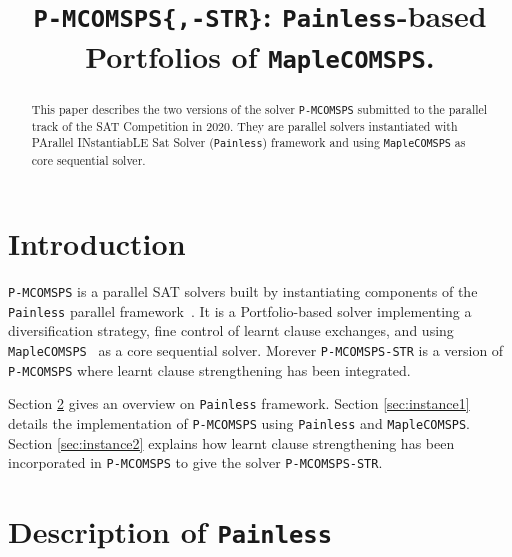 \documentclass[conference]{IEEEtran}
\newcommand{\painless}[0]{\texttt{Painless}\xspace}
\newcommand{\maple}[0]{\texttt{MapleCOMSPS}\xspace}
\newcommand{\pmcomsps}[0]{\texttt{P-MCOMSPS}\xspace}
\newcommand{\preduce}[0]{\texttt{P-MCOMSPS-STR}\xspace}
\begin{document}
\title{\texttt{P-MCOMSPS\{,-STR\}}: \painless-based Portfolios of \maple.}

\author{
}

\maketitle

\begin{abstract}
   This paper describes the two versions of the solver \pmcomsps submitted to
   the parallel track of the SAT Competition in 2020. They are parallel solvers
   instantiated with PArallel INstantiabLE Sat Solver (\painless) framework and
   using \maple as core sequential solver.
\end{abstract}

\IEEEpeerreviewmaketitle

\section{Introduction}

\pmcomsps is a parallel SAT solvers built by instantiating components of the
\painless parallel framework~\cite{painless_17}. It is a Portfolio-based solver
implementing a diversification strategy, fine control of learnt clause
exchanges, and using \maple~\cite{maplecomsps_17} as a core sequential solver.
Morever \preduce is a version of \pmcomsps where learnt clause strengthening
has been integrated.

Section \ref{sec:painless} gives an overview on \painless framework. Section
\ref{sec:instance1} details the implementation of \pmcomsps using \painless and
\maple. Section \ref{sec:instance2} explains how learnt clause strengthening
has been incorporated in \pmcomsps to give the solver \preduce.

\section{Description of \painless}
\label{sec:painless}
\end{document}
